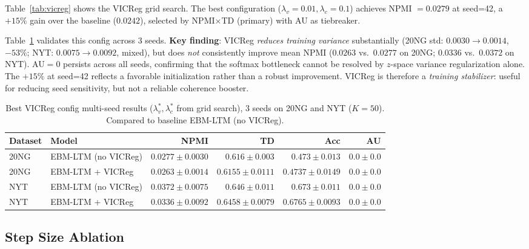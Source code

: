 \documentclass[10pt]{article}
\begin{document}
Table~\ref{tab:vicreg} shows the VICReg grid search.
The best configuration ($\lambda_v=0.01, \lambda_c=0.1$) achieves NPMI $= 0.0279$ at seed=42,
a $+15\%$ gain over the baseline ($0.0242$), selected by NPMI$\times$TD (primary) with AU as tiebreaker.

Table~\ref{tab:vicreg_multiseed} validates this config across 3 seeds.
\textbf{Key finding}: VICReg \emph{reduces training variance} substantially
(20NG std: $0.0030 \to 0.0014$, $-53\%$; NYT: $0.0075 \to 0.0092$, mixed),
but does \emph{not} consistently improve mean NPMI
($0.0263$ vs.\ $0.0277$ on 20NG; $0.0336$ vs.\ $0.0372$ on NYT).
AU$=0$ persists across all seeds, confirming that the softmax bottleneck
cannot be resolved by $z$-space variance regularization alone.
The $+15\%$ at seed=42 reflects a favorable initialization rather than a robust improvement.
VICReg is therefore a \emph{training stabilizer}: useful for reducing seed sensitivity,
but not a reliable coherence booster.

\begin{table}[t]
\centering
\caption{Best VICReg config multi-seed results ($\lambda_v^*, \lambda_c^*$ from grid search),
3 seeds on 20NG and NYT ($K=50$). Compared to baseline EBM-LTM (no VICReg).}
\label{tab:vicreg_multiseed}
\small
\begin{tabular}{llrrrr}
\hline
\textbf{Dataset} & \textbf{Model} & \textbf{NPMI} & \textbf{TD} & \textbf{Acc} & \textbf{AU} \\
\hline
  20NG & EBM-LTM (no VICReg) & $0.0277\pm0.0030$ & $0.616\pm0.003$ & $0.473\pm0.013$ & $0.0\pm0.0$ \\
  20NG & EBM-LTM + VICReg & $0.0263\pm0.0014$ & $0.6155\pm0.0111$ & $0.4737\pm0.0149$ & $0.0\pm0.0$ \\
  NYT & EBM-LTM (no VICReg) & $0.0372\pm0.0075$ & $0.646\pm0.011$ & $0.673\pm0.011$ & $0.0\pm0.0$ \\
  NYT & EBM-LTM + VICReg & $0.0336\pm0.0092$ & $0.6458\pm0.0079$ & $0.6765\pm0.0093$ & $0.0\pm0.0$ \\
\hline
\end{tabular}
\end{table}

\subsection{Step Size Ablation}
\label{sec:stepsize_ablation}
\end{document}
